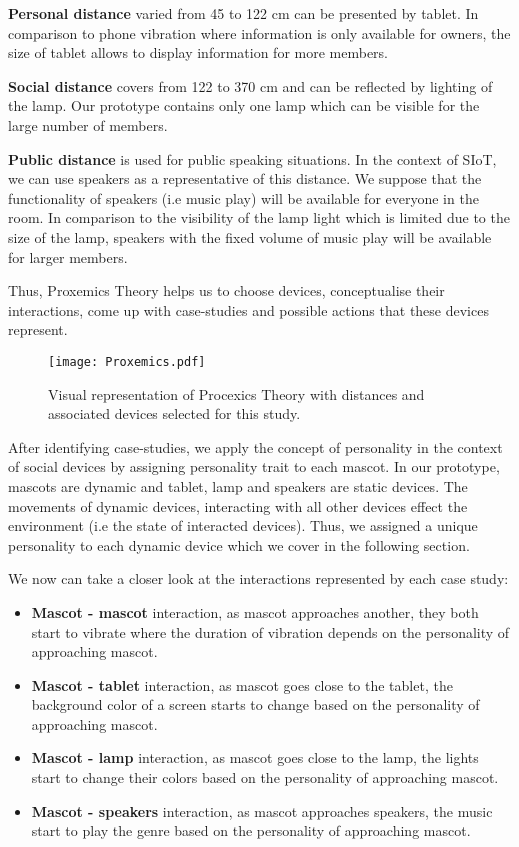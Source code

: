 \textbf{Personal distance} varied from 45 to 122 cm can be presented by tablet.
In comparison to phone vibration where information is only available for owners,
the size of tablet allows to display information for more members.

\textbf{Social distance} covers from 122 to 370 cm and can be reflected by lighting of the lamp.
Our prototype contains only one lamp which can be visible for the large number of members.

\textbf{Public distance} is used for public speaking situations.
In the context of SIoT, we can use speakers as a representative of this distance.
We suppose that the functionality of speakers (i.e music play) will be available for everyone in the room.
In comparison to the visibility of the lamp light which is limited due to the size of the lamp,
speakers with the fixed volume of music play will be available for larger members.

Thus, Proxemics Theory helps us to choose devices, conceptualise their interactions,
come up with case-studies and possible actions that these devices represent.

\begin{figure}[hbt!]
    \centering
    \texttt{[image: Proxemics.pdf]}
    \caption{Visual representation of Procexics Theory with distances and associated devices selected for
    this study.}
    \label{fig:Proxemics}
\end{figure}

After identifying case-studies, we apply the concept of personality in the context of
social devices by assigning personality trait to each mascot.
In our prototype, mascots are dynamic and tablet, lamp and speakers are static devices.
The movements of dynamic devices, interacting with all other
devices effect the environment (i.e the state of interacted devices).
Thus, we assigned a unique personality to each dynamic device which we cover in the following section.

We now can take a closer look at the interactions represented by each case study:
\begin{itemize}
  \item \textbf{Mascot - mascot} interaction, as mascot approaches another,
        they both start to vibrate where the duration of vibration depends on the personality of approaching mascot.
  \item \textbf{Mascot - tablet} interaction, as mascot goes close to the tablet, the background
        color of a screen starts to change based on the personality of approaching mascot.
   \item \textbf{Mascot - lamp} interaction, as mascot goes close to the lamp,
        the lights start to change their colors based on the personality of approaching mascot.
   \item \textbf{Mascot - speakers} interaction, as mascot approaches speakers,
        the music start to play the genre based on the personality of approaching mascot.
\end{itemize}

